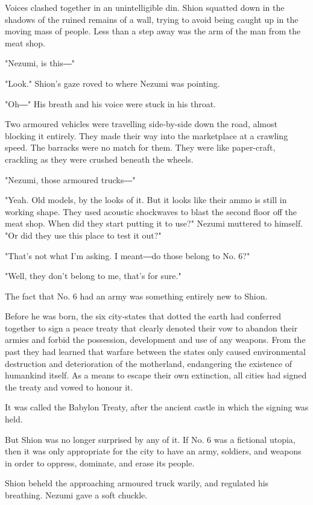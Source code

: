 \myspace

Voices clashed together in an unintelligible din. Shion squatted down in
the shadows of the ruined remains of a wall, trying to avoid being
caught up in the moving mass of people. Less than a step away was the
arm of the man from the meat shop.

"Nezumi, is this―"

"Look." Shion's gaze roved to where Nezumi was pointing.

"Oh―" His breath and his voice were stuck in his throat.

Two armoured vehicles were travelling side-by-side down the road, almost
blocking it entirely. They made their way into the marketplace at a
crawling speed. The barracks were no match for them. They were like
paper-craft, crackling as they were crushed beneath the wheels.

"Nezumi, those armoured trucks―"

"Yeah. Old models, by the looks of it. But it looks like their ammo is
still in working shape. They used acoustic shockwaves to blast the
second floor off the meat shop. When did they start putting it to use?"
Nezumi muttered to himself. "Or did they use this place to test it out?"

"That's not what I'm asking. I meant―do those belong to No. 6?"

"Well, they don't belong to me, that's for sure."

The fact that No. 6 had an army was something entirely new to Shion.

Before he was born, the six city-states that dotted the earth had
conferred together to sign a peace treaty that clearly denoted their vow
to abandon their armies and forbid the possession, development and use
of any weapons. From the past they had learned that warfare between the
states only caused environmental destruction and deterioration of the
motherland, endangering the existence of humankind itself. As a means to
escape their own extinction, all cities had signed the treaty and vowed
to honour it.

It was called the Babylon Treaty, after the ancient castle in which the
signing was held.

But Shion was no longer surprised by any of it. If No. 6 was a fictional
utopia, then it was only appropriate for the city to have an army,
soldiers, and weapons in order to oppress, dominate, and erase its
people.

Shion beheld the approaching armoured truck warily, and regulated his
breathing. Nezumi gave a soft chuckle.

